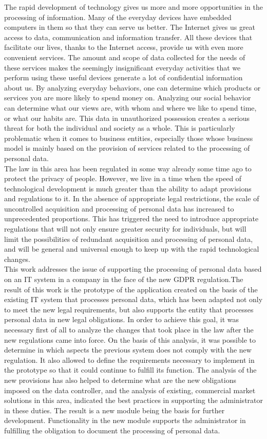 \documentclass[en, noamssymb]{mgr}
\begin{document}
The rapid development of technology gives us more and more opportunities in the processing of information. Many of the everyday devices have embedded computers in them so that they can serve us better. The Internet gives us great access to data, communication and information transfer. All these devices that facilitate our lives, thanks to the Internet access, provide us with even more convenient services. The amount and scope of data collected for the needs of these services makes the seemingly insignificant everyday activities that we perform using these useful devices generate a lot of confidential information about us. By analyzing everyday behaviors, one can determine which products or services you are more likely to spend money on. Analyzing our social behavior can determine what our views are, with whom and where we like to spend time, or what our habits are. This data in unauthorized possession creates a serious threat for both the individual and society as a whole. This is particularly problematic when it comes to business entities, especially those whose business model is mainly based on the provision of services related to the processing of personal data.\\
\indent The law in this area has been regulated in some way already some time ago to protect the privacy of people. However, we live in a time when the speed of technological development is much greater than the ability to adapt provisions and regulations to it. In the absence of appropriate legal restrictions, the scale of uncontrolled acquisition and processing of personal data has increased to unprecedented proportions. This has triggered the need to introduce appropriate regulations that will not only ensure greater security for individuals, but will limit the possibilities of redundant acquisition and processing of personal data, and will be general and universal enough to keep up with the rapid technological changes.\\
\indent This work addresses the issue of supporting the processing of personal data based on an IT system in a company in the face of the new GDPR regulation.The result of this work is the prototype of the application created on the basis of the existing IT system that processes personal data, which has been adapted not only to meet the new legal requirements, but also supports the entity that processes personal data in new legal obligations. In order to achieve this goal, it was necessary first of all to analyze the changes that took place in the law after the new regulations came into force. On the basis of this analysis, it was possible to determine in which aspects the previous system does not comply with the new regulation. It also allowed to define the requirements necessary to implement in the prototype so that it could continue to fulfill its function. The analysis of the new provisions has also helped to determine what are the new obligations imposed on the data controller, and the analysis of existing, commercial market solutions in this area, indicated the best practices in supporting the administrator in these duties. The result is a new module being the basis for further development. Functionality in the new module supports the administrator in fulfilling the obligation to document the processing of personal data.\\
\end{document}
